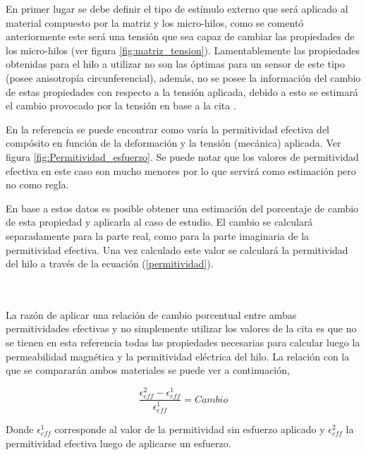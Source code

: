 \documentclass[12pt,letterpaper]{article}
\numberwithin{equation}{section}
\begin{document}
\begin{minipage}{0.5\linewidth}
	En primer lugar se debe definir el tipo de estímulo externo que será aplicado al material compuesto por la matriz y los micro-hilos, como se comentó anteriormente este será una tensión que sea capaz de cambiar las propiedades de los micro-hilos (ver figura \ref{fig:matriz_tension}). Lamentablemente las propiedades obtenidas para el hilo a utilizar no son las óptimas para un sensor de este tipo (posee anisotropía circunferencial), además, no se posee la información del cambio de estas propiedades con respecto a la tensión aplicada, debido a esto se estimará el cambio provocado por la tensión en base a la cita \cite{Wire_backgound}.
	
	En la referencia \cite{Wire_backgound} se puede encontrar como varía la permitividad efectiva del compósito en función de la deformación y la tensión (mecánica) aplicada. Ver figura \ref{fig:Permitividad_esfuerzo}. Se puede notar que los valores de permitividad efectiva en este caso son mucho menores por lo que servirá como estimación pero no como regla. 
	
	En base a estos datos es posible obtener una estimación del porcentaje de cambio de esta propiedad y aplicarla al caso de estudio. El cambio se calculará separadamente para la parte real, como para la parte imaginaria de la permitividad efectiva. Una vez calculado este valor se calculará la permitividad del hilo a través de la ecuación (\ref{permitividad}).
\end{minipage}\\\\

La razón de aplicar una relación de cambio porcentual entre ambas permitividades efectivas y no simplemente utilizar los valores de la cita \cite{Wire_backgound} es que no se tienen en esta referencia todas las propiedades necesarias para calcular luego la permeabilidad magnética y la permitividad eléctrica del hilo. La relación con la que se compararán ambos materiales se puede ver a continuación,

$$\frac{\epsilon^2_{eff}-\epsilon^1_{eff}}{\epsilon^1_{eff}} = Cambio$$

Donde $\epsilon^1_{eff}$ corresponde al valor de la permitividad sin esfuerzo aplicado y $\epsilon^2_{eff}$ la permitividad efectiva luego de aplicarse un esfuerzo.
\end{document}
